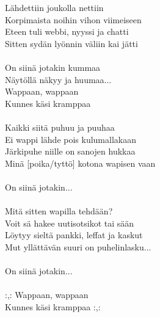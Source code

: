 
            Lähdettiin joukolla nettiin \\
            Korpimaista noihin vihon viimeiseen \\
            Eteen tuli webbi, nyyssi ja chatti \\
            Sitten sydän lyönnin väliin kai jätti \\
\hspace{10mm} \\
            On siinä jotakin kummaa \\
            Näytöllä näkyy ja huumaa... \\
            Wappaan, wappaan \\
            Kunnes käsi kramppaa \\
\hspace{10mm} \\
            Kaikki siitä puhuu ja puuhaa \\
            Ei wappi lähde pois kulumallakaan \\
            Järkipuhe niille on sanojen hukkaa \\
            Minä [poika/tyttö] kotona wapisen vaan \\
\hspace{10mm} \\
            On siinä jotakin... \\
\hspace{10mm} \\
            Mitä sitten wapilla tehdään? \\
            Voit sä hakee uutisotsikot tai sään \\
            Löytyy sieltä pankki, leffat ja kaskut \\
            Mut yllättävän suuri on puhelinlasku... \\
\hspace{10mm} \\
            On siinä jotakin... \\
\hspace{10mm} \\
            :,: Wappaan, wappaan \\
            Kunnes käsi kramppaa :,: \\
